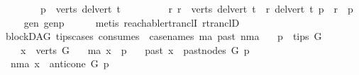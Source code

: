 \begin{isabellebody}
\ \ \isamarkupfalse%
\isanewline
\ \ \isamarkupfalse%
\ \isamarkupfalse%
\ {\isachardoublequoteopen}\ {\isasymexists}p\ {\isasymin}\ verts\ {\isacharparenleft}{\kern0pt}del{\isacharunderscore}{\kern0pt}vert\ t{\isacharparenright}{\kern0pt}\ {\isachardot}{\kern0pt}\isanewline
\ \ \ \ \ \ \ \ {\isacharparenleft}{\kern0pt}{\isasymforall}r{\isachardot}{\kern0pt}\ r\ {\isasymin}\ verts\ {\isacharparenleft}{\kern0pt}del{\isacharunderscore}{\kern0pt}vert\ t{\isacharparenright}{\kern0pt}\ {\isasymlongrightarrow}\ {\isacharparenleft}{\kern0pt}r\ {\isasymrightarrow}\isactrlsup {\isacharplus}{\kern0pt}\isactrlbsub del{\isacharunderscore}{\kern0pt}vert\ t\isactrlesub \ p\ {\isasymor}\ r\ {\isacharequal}{\kern0pt}\ p{\isacharparenright}{\kern0pt}{\isacharparenright}{\kern0pt}{\isachardoublequoteclose}\isanewline
\ \ \ \ \isamarkupfalse%
\ gen\ genp\isanewline
\ \ \ \ \isamarkupfalse%
\ {\isacharparenleft}{\kern0pt}metis\ reachable{\isacharunderscore}{\kern0pt}rtranclI\ rtranclD{\isacharparenright}{\kern0pt}\ \isanewline
{}\isamarkupfalse%
%
\endisatagproof
{\isafoldproof}%
%
\isadelimproof
\isanewline
%
\endisadelimproof
\isanewline
\isanewline
{}\isamarkupfalse%
\ {\isacharparenleft}{\kern0pt}\ blockDAG{\isacharparenright}{\kern0pt}\ tips{\isacharunderscore}{\kern0pt}cases\ {\isacharbrackleft}{\kern0pt}consumes\ {}{\isacharcomma}{\kern0pt}\ case{\isacharunderscore}{\kern0pt}names\ ma\ past\ nma{\isacharbrackright}{\kern0pt}{\isacharcolon}{\kern0pt}\isanewline
\ \ \ {\isachardoublequoteopen}p\ {\isasymin}\ tips\ G{\isachardoublequoteclose}\isanewline
\ \ \ \ \ {\isachardoublequoteopen}x\ {\isasymin}\ verts\ G{\isachardoublequoteclose}\isanewline
\ \ \ {\isacharparenleft}{\kern0pt}ma{\isacharparenright}{\kern0pt}\ {\isachardoublequoteopen}x\ {\isacharequal}{\kern0pt}\ p{\isachardoublequoteclose}\isanewline
\ \ {\isacharbar}{\kern0pt}\ {\isacharparenleft}{\kern0pt}past{\isacharparenright}{\kern0pt}\ {\isachardoublequoteopen}x\ {\isasymin}\ past{\isacharunderscore}{\kern0pt}nodes\ G\ p{\isachardoublequoteclose}\isanewline
\ \ {\isacharbar}{\kern0pt}\ {\isacharparenleft}{\kern0pt}nma{\isacharparenright}{\kern0pt}\ {\isachardoublequoteopen}x\ {\isasymin}\ anticone\ G\ p{\isachardoublequoteclose}\ \ \ \ \ \ \isanewline
%
\isadelimproof
%
\endisadelimproof
%
\isatagproof
{}\isamarkupfalse%
\ {\isacharminus}{\kern0pt}\isanewline
\ \ \isamarkupfalse%

\end{isabellebody}
